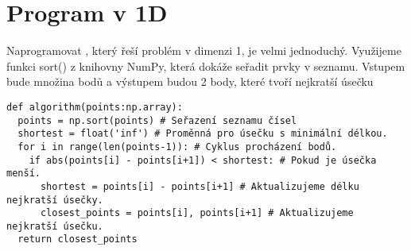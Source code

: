 \section{Program v 1D}
\label{sec:program_1D}
Naprogramovat , který řeší problém v dimenzi 1, je velmi jednoduchý. Využijeme funkci sort() z knihovny NumPy, která dokáže seřadit prvky v seznamu. Vstupem bude množina bodů a výstupem budou 2 body, které tvoří nejkratší úsečku

\begin{mdframed}[style=MyFrame]
\begin{lstlisting}[style=metoo]
def algorithm(points:np.array):
  points = np.sort(points) # Seřazení seznamu čísel
  shortest = float('inf') # Proměnná pro úsečku s minimální délkou.
  for i in range(len(points-1)): # Cyklus procházení bodů.
    if abs(points[i] - points[i+1]) < shortest: # Pokud je úsečka menší.
      shortest = points[i] - points[i+1] # Aktualizujeme délku nejkratší úsečky.
      closest_points = points[i], points[i+1] # Aktualizujeme nejkratší úsečku.
  return closest_points
\end{lstlisting}
\end{mdframed}
